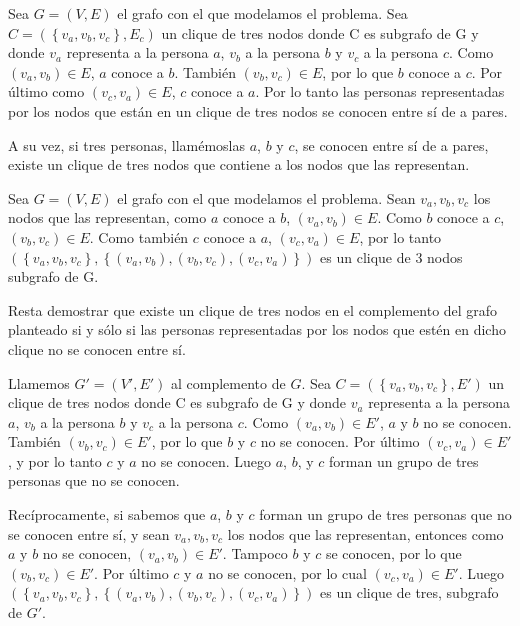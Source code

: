 \documentclass[a4paper, 12pt]{article}
\begin{document}
Sea $G = \left( V, E \right)$ el grafo con el que modelamos el problema. Sea $ C = \left( \left\lbrace v_a, v_b,v_c \right\rbrace, E_c \right) $ un clique de tres nodos donde C es subgrafo de G y donde $v_a$ representa a la persona $a$, $v_b$ a la persona $b$ y $v_c$ a la persona $c$. Como $\left( v_a, v_b \right) \in E $, $a$ conoce a $b$. Tambi\'en $\left(v_b,v_c\right) \in E$, por lo que $b$ conoce a $c$. Por \'ultimo como $\left(v_c,v_a\right) \in E$, $c$ conoce a $a$. Por lo tanto las personas representadas por los nodos que est\'an en un clique de tres nodos se conocen entre s\'i de a pares.


A su vez, si tres personas, llam\'emoslas $a$, $b$ y $c$, se conocen entre s\'i de a pares, existe un clique de tres nodos que contiene a los nodos que las representan. 


Sea $ G = \left( V, E \right) $ el grafo con el que modelamos el problema. Sean $v_a, v_b, v_c$ los nodos que las representan, como $a$ conoce a $b$, $\left( v_a,v_b \right) \in E $. Como $b$ conoce a $c$, $ \left(v_b, v_c \right) \in E$. Como tambi\'en $c$ conoce a $a$, $ \left( v_c, v_a \right) \in E$, por lo tanto $\left( \left\lbrace v_a, v_b, v_c \right\rbrace, \left\lbrace  \left(v_a,v_b\right) , \left( v_b,v_c\right), \left( v_c, v_a\right) \right\rbrace\right)$ es un clique de 3 nodos subgrafo de G.


Resta demostrar que existe un clique de tres nodos en el complemento del grafo planteado si y s\'olo si las personas representadas por los nodos que est\'en en dicho clique no se conocen entre s\'i.


Llamemos $G' = \left( V', E' \right)$ al complemento de $G$.  Sea $ C = \left( \left\lbrace v_a, v_b,v_c \right\rbrace, E' \right) $ un clique de tres nodos donde C es subgrafo de G y donde $v_a$ representa a la persona $a$, $v_b$ a la persona $b$ y $v_c$ a la persona $c$. Como $\left( v_a,v_b\right) \in E'$, $a$ y $b$ no se conocen. Tambi\'en $\left( v_b,v_c\right) \in E'$, por lo que $b$ y $c$ no se conocen. Por \'ultimo $\left( v_c,v_a\right) \in E'$, y por lo tanto $c$ y $a$ no se conocen. Luego $a$, $b$, y $c$ forman un grupo de tres personas que no se conocen.



Rec\'iprocamente, si sabemos que $a$, $b$ y $c$ forman un grupo de tres personas que no se conocen entre s\'i, y sean $v_a, v_b, v_c$ los nodos que las representan, entonces como $a$ y $b$ no se conocen, $\left(v_a,v_b\right) \in E'$. Tampoco $b$ y $c$ se conocen, por lo que $\left(v_b,v_c\right) \in E'$. Por \'ultimo $c$ y $a$ no se conocen, por lo cual $\left(v_c,v_a\right) \in E'$. Luego $\left( \left\lbrace v_a, v_b, v_c \right\rbrace, \left\lbrace  \left(v_a,v_b\right) , \left( v_b,v_c\right), \left( v_c, v_a\right) \right\rbrace\right)$ es un clique de tres, subgrafo de $G'$.
\end{document}
